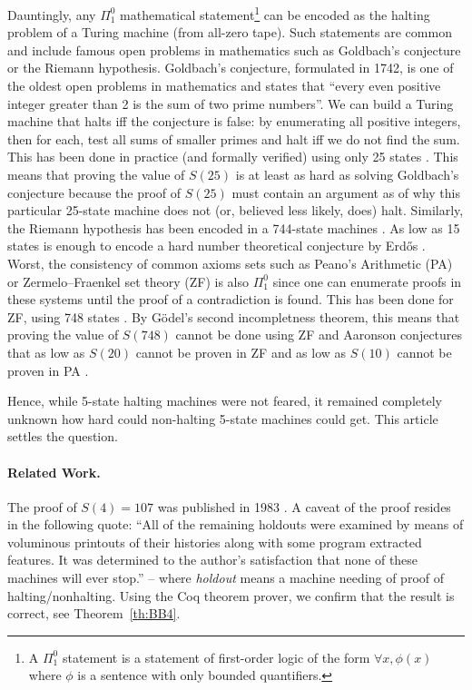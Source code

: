 \documentclass[a4paper,british]{article}
\theoremstyle{definition} %
\numberwithin{equation}{section}
\theoremstyle{definition} %
\newcommand{\BBtheFourth}{107}
\begin{document}
Dauntingly, any $\Pi_1^0$ mathematical statement\footnote{A $\Pi_1^0$ statement is a statement of first-order logic of the form $\forall x, \phi(x)$ where $\phi$ is a sentence with only bounded quantifiers.} can be encoded as the halting problem of a Turing machine (from all-zero tape). Such statements are common and include famous open problems in mathematics such as Goldbach's conjecture or the Riemann hypothesis. Goldbach's conjecture, formulated in 1742, is one of the oldest open problems in mathematics and states that ``every even positive integer greater than 2 is the sum of two prime numbers''. We can build a Turing machine that halts iff the conjecture is false: by enumerating all positive integers, then for each, test all sums of smaller primes and halt iff we do not find the sum. This has been done in practice (and formally verified) using only 25 states \cite{GoldbachTM27, GoldbachTM25}. This means that proving the value of $S(25)$ is at least as hard as solving Goldbach's conjecture because the proof of $S(25)$ must contain an argument as of why this particular 25-state machine does not (or, believed less likely, does) halt. Similarly, the Riemann hypothesis has been encoded in a 744-state machines \cite{RiemannTM,Yedidia2016,BusyBeaverFrontier}. As low as 15 states is enough to encode a hard number theoretical conjecture by Erd\H{o}s \cite{BB15}. Worst, the consistency of common axioms sets such as Peano's Arithmetic (PA) or Zermelo–Fraenkel set theory (ZF) is also $\Pi_1^0$ since one can enumerate proofs in these systems until the proof of a contradiction is found. This has been done for ZF, using 748 states \cite{ZFTM,Yedidia2016,BusyBeaverFrontier,BB748Thesis}. By G\"odel's second incompletness theorem, this means that proving the value of $S(748)$ cannot be done using ZF and Aaronson conjectures that as low as $S(20)$ cannot be proven in ZF and as low as $S(10)$ cannot be proven in PA \cite{BusyBeaverFrontier}.

Hence, while 5-state halting machines were not feared, it remained completely unknown how hard could non-halting 5-state machines could get. This article settles the question.

\paragraph{Related Work.} The proof of $S(4) = \BBtheFourth$ was published in 1983 \cite{Brady83}. A caveat of the proof resides in the following quote: ``All of the remaining holdouts were examined by means of voluminous printouts of their histories along with some program extracted features. It was determined to the author's satisfaction that none of these machines will ever stop.'' -- where \textit{holdout} means a machine needing of proof of halting/nonhalting. Using the Coq theorem prover, we confirm that the result is correct, see Theorem~\ref{th:BB4}.
\end{document}
